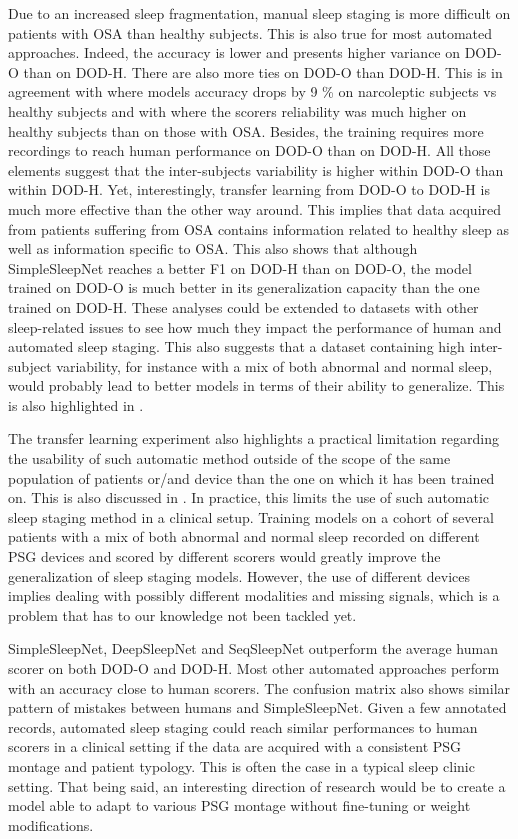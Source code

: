 \documentclass[journal]{IEEEtran}
\begin{document}
Due to an increased sleep fragmentation, manual sleep staging is more difficult on patients with OSA than healthy subjects. This is also true for most automated approaches. Indeed, the accuracy is lower and presents higher variance on DOD-O than on DOD-H. There are also more ties on DOD-O than DOD-H. This is in agreement with \cite{Stephansen2018} where models accuracy drops by 9 \% on narcoleptic subjects vs healthy subjects and with \cite{penzel2013} where the scorers reliability was much higher on healthy subjects than on those with OSA. Besides, the training requires more recordings to reach human performance on DOD-O than on DOD-H. All those elements suggest that the inter-subjects variability is higher within DOD-O than within DOD-H. 
Yet, interestingly, transfer learning from DOD-O to DOD-H is much more effective than the other way around. This implies that data acquired from patients suffering from OSA contains information related to healthy sleep as well as information specific to OSA. This also shows that although SimpleSleepNet reaches a better F1 on DOD-H than on DOD-O, the model trained on DOD-O is much better in its generalization capacity than the one trained on DOD-H. These analyses could be extended to datasets with other sleep-related issues to see how much they impact the performance of human and automated sleep staging. This also suggests that a dataset containing high inter-subject variability, for instance with a mix of both abnormal and normal sleep, would probably lead to better models in terms of their ability to generalize. This is also highlighted in \cite{Stephansen2018}.

The transfer learning experiment also highlights a practical limitation regarding the usability of such automatic method outside of the scope of the same population of patients or/and device than the one on which it has been trained on. This is also discussed in \cite{Chambon2018transfer}. In practice, this limits the use of such automatic sleep staging method in a clinical setup. Training models on a cohort of several patients with a mix of both abnormal and normal sleep recorded on different PSG devices and scored by different scorers would greatly improve the generalization of sleep staging models. However, the use of different devices implies dealing with possibly different modalities and missing signals, which is a problem that has to our knowledge not been tackled yet.

SimpleSleepNet, DeepSleepNet and SeqSleepNet outperform the average human scorer on both DOD-O and DOD-H. Most other automated approaches perform with an accuracy close to human scorers. The confusion matrix also shows similar pattern of mistakes between humans and SimpleSleepNet. Given a few annotated records, automated sleep staging could reach similar performances to human scorers in a clinical setting if the data are acquired with a consistent PSG montage and patient typology. This is often the case in a typical sleep clinic setting. That being said, an interesting direction of research would be to create a model able to adapt to various PSG montage without fine-tuning or weight modifications.
\end{document}
